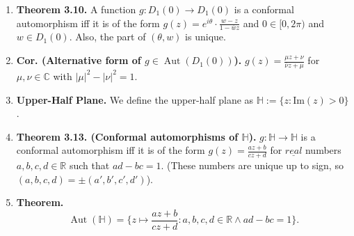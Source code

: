 \documentclass[12pt]{article}
\theoremstyle{definition}
\theoremstyle{named}
\DeclareMathOperator{\Aut}{Aut}
\begin{document}
{\begin{multicols}{2}
\begin{spacing}{1.01}
\begin{enumerate}
\begin{enumerate}
        \item $\phi_w^{-1} = \phi_w$. 
    \end{enumerate}
    \item \textbf{Theorem 3.10. } A function $g: D_1(0) \to D_1(0)$ is a conformal automorphism iff it is of the form $g(z) = e^{i\theta} \cdot \frac{w-z}{1-\overline{w}z}$ and $0 \in [0,2\pi)$ and $w \in D_1(0)$. Also, the part of $(\theta,w)$ is unique. 
    \item \textbf{Cor. (Alternative form of $g \in \Aut(D_1(0))$). } $g(z) = \frac{\mu z + \nu}{\overline{\nu}z + \mu}$ for $\mu,\nu \in \mathbb{C}$ with $|\mu|^2 - |\nu|^2 = 1$.
    \item \textbf{Upper-Half Plane. } We define the upper-half plane as $\mathbb{H} := \{z: \textrm{Im}(z)>0\}$. 
    \item \textbf{Theorem 3.13. (Conformal automorphisms of $\mathbb{H}$). } $g: \mathbb{H} \to \mathbb{H}$ is a conformal automorphism iff it is of the form $g(z) = \frac{az+b}{cz+d}$ for $\underline{real}$ numbers $a,b,c,d \in \mathbb{R}$ such that $ad-bc = 1$. (These numbers are unique up to sign, so $(a,b,c,d) = \pm(a',b',c',d')$). 
    \item \textbf{Theorem. }
    $$
    \Aut(\mathbb{H}) = \{z \mapsto \frac{az+b}{cz+d} : a,b,c,d \in \mathbb{R} \land ad-bc=1\}. 
    $$
\end{enumerate}

\end{spacing}
\end{multicols}

}
\end{document}
